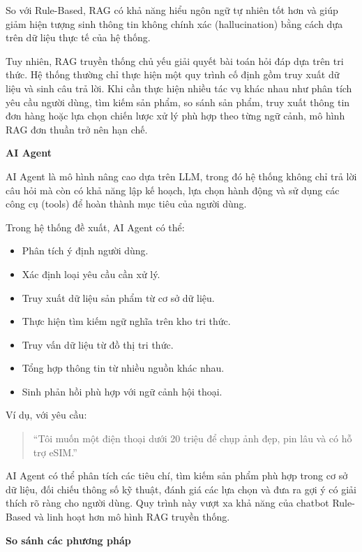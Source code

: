 So với Rule-Based, RAG có khả năng hiểu ngôn ngữ tự nhiên tốt hơn và giúp giảm hiện tượng sinh thông tin không chính xác (hallucination) bằng cách dựa trên dữ liệu thực tế của hệ thống.

Tuy nhiên, RAG truyền thống chủ yếu giải quyết bài toán hỏi đáp dựa trên tri thức. Hệ thống thường chỉ thực hiện một quy trình cố định gồm truy xuất dữ liệu và sinh câu trả lời. Khi cần thực hiện nhiều tác vụ khác nhau như phân tích yêu cầu người dùng, tìm kiếm sản phẩm, so sánh sản phẩm, truy xuất thông tin đơn hàng hoặc lựa chọn chiến lược xử lý phù hợp theo từng ngữ cảnh, mô hình RAG đơn thuần trở nên hạn chế.

\textbf{AI Agent}

AI Agent là mô hình nâng cao dựa trên LLM, trong đó hệ thống không chỉ trả lời câu hỏi mà còn có khả năng lập kế hoạch, lựa chọn hành động và sử dụng các công cụ (tools) để hoàn thành mục tiêu của người dùng.

Trong hệ thống đề xuất, AI Agent có thể:

\begin{itemize}
    \item Phân tích ý định người dùng.
    \item Xác định loại yêu cầu cần xử lý.
    \item Truy xuất dữ liệu sản phẩm từ cơ sở dữ liệu.
    \item Thực hiện tìm kiếm ngữ nghĩa trên kho tri thức.
    \item Truy vấn dữ liệu từ đồ thị tri thức.
    \item Tổng hợp thông tin từ nhiều nguồn khác nhau.
    \item Sinh phản hồi phù hợp với ngữ cảnh hội thoại.
\end{itemize}

Ví dụ, với yêu cầu:

\begin{quote}
``Tôi muốn một điện thoại dưới 20 triệu để chụp ảnh đẹp, pin lâu và có hỗ trợ eSIM.''
\end{quote}

AI Agent có thể phân tích các tiêu chí, tìm kiếm sản phẩm phù hợp trong cơ sở dữ liệu, đối chiếu thông số kỹ thuật, đánh giá các lựa chọn và đưa ra gợi ý có giải thích rõ ràng cho người dùng. Quy trình này vượt xa khả năng của chatbot Rule-Based và linh hoạt hơn mô hình RAG truyền thống.

\textbf{So sánh các phương pháp}


